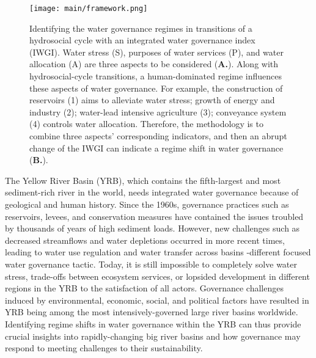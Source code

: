 \documentclass[draft]{../agujournal2019}
\providecommand{\DIFadd}[1]{{\protect\color{blue}\uwave{#1}}} %
\providecommand{\DIFaddbegin}{} %
\providecommand{\DIFaddend}{} %
\begin{document}
\begin{figure*}[!ht]
	\centering
	\texttt{[image: main/framework.png]}
	\caption{
		Identifying the water governance regimes in transitions of a hydrosocial cycle with an integrated water governance index (IWGI). Water stress (S), purposes of water services (P), and water allocation (A) are three aspects to be considered (\textbf{A.}). Along with hydrosocial-cycle transitions, a human-dominated regime influences these aspects of water governance. For example, the construction of reservoirs (1) aims to alleviate water stress; growth of energy and industry (2); water-lead intensive agriculture (3); conveyance system (4) controls water allocation.
		Therefore, the methodology is to combine three aspects' corresponding indicators, and then an abrupt change of the IWGI can indicate a regime shift in water governance (\textbf{B.}).
	}\label{fig:framework}
\end{figure*}


The Yellow River Basin (YRB), which contains the fifth-largest and most sediment-rich river in the world, needs integrated water governance because of geological and human history\DIFaddbegin \DIFadd{~}\DIFaddend \cite{mostern2021,best2019}.
Since the 1960s, governance practices such as reservoirs, levees, and conservation measures have contained the issues troubled by thousands of years of high sediment loads\DIFaddbegin \DIFadd{~}\DIFaddend \cite{wang2016e,song2020a}.
However, new challenges such as decreased streamflows and water depletions occurred in more recent times, leading to water use regulation and water transfer across basins -different focused water governance tactic\DIFaddbegin \DIFadd{~}\DIFaddend \cite{wang2019c}.
Today, it is still impossible to completely solve water stress, trade-offs between ecosystem services, or lopsided development in different regions in the YRB to the satisfaction of all actors\DIFaddbegin \DIFadd{~}\DIFaddend \cite{wohlfart2016a}.
Governance challenges induced by environmental, economic, social, and political factors have resulted in YRB being among the most intensively-governed large river basins worldwide\DIFaddbegin \DIFadd{~}\DIFaddend \cite{nickum2021}.
Identifying regime shifts in water governance within the YRB can thus provide crucial insights into rapidly-changing big river basins and how governance may respond to meeting challenges to their sustainability.
\end{document}
